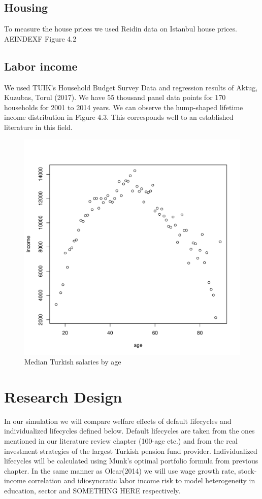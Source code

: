 \subsection{Housing}
To measure the house prices we used Reidin data on Istanbul house prices. AEINDEXF Figure 4.2


\subsection{Labor income}
We used TUIK's Household Budget Survey Data and regression results of Aktug, Kuzubas, Torul (2017). We have 55 thousand panel data points for 170 households for 2001 to 2014 years. We can observe the hump-shaped lifetime income distribution in Figure 4.3. This corresponds well to an established literature in this field.

\begin{figure}[h]
	\centering
	\includegraphics[scale=0.5]{figs/wage2median.pdf}
	\caption{Median Turkish salaries by age}
\end{figure}

\section{Research Design}
In our simulation we will compare welfare effects of default lifecycles and individualized lifecycles defined below. Default lifecycles are taken from the ones mentioned in our literature review chapter (100-age etc.) and from the real investment strategies of the largest Turkish pension fund provider. Individualized lifecycles will be calculated using Munk's optimal portfolio formula from previous chapter. In the same manner as Olear(2014) we will use wage growth rate, stock-income correlation and idiosyncratic labor income risk to model heterogeneity in education, sector and SOMETHING HERE respectively.

